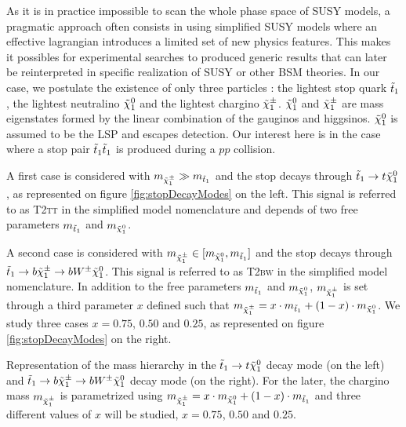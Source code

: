         As it is in practice impossible to scan the whole phase space of SUSY models, a 
        pragmatic approach often consists in using simplified SUSY models where an 
        effective lagrangian introduces a limited set of new physics features. This makes
        it possibles for experimental searches to produced generic results that can later
        be reinterpreted in specific realization of SUSY \cite{LiemSMS, SmodelS} 
        or other BSM theories. In our case, we postulate the existence of only three 
        particles : the lightest stop quark $\tilde{t}_1$, the lightest neutralino $\tilde{\chi}_1^0$ 
        and the lightest chargino $\tilde{\chi}_1^\pm$. $\tilde{\chi}_1^0$ and $\tilde{\chi}_1^\pm$ are mass 
        eigenstates formed by the linear combination of the gauginos and  higgsinos. 
        $\tilde{\chi}_1^0$ is assumed to be the LSP and escapes detection. Our interest here 
        is in the case where a stop pair $\tilde{t}_1\tilde{t}_1$ is produced during a $pp$ collision.

        A first case is considered with $m_{\tilde{\chi}_1^\pm} \gg m_{\tilde{t}_1}$ and the stop 
        decays through $\tilde{t}_1 \rightarrow t \tilde{\chi}_1^0$, as represented on figure 
        \ref{fig:stopDecayModes} on the left. This signal is referred to as \textsc{T2tt} 
        in the simplified model nomenclature and depends of two free parameters 
        $m_{\tilde{t}_1}$ and $m_{\tilde{\chi}_1^0}$.

        A second case is considered with $m_{\tilde{\chi}_1^\pm} \in [m_{\tilde{\chi}_1^0}, 
        m_{\tilde{t}_1}]$ and the stop decays through $\tilde{t}_1 \rightarrow b \tilde{\chi}_1^\pm 
        \rightarrow b W^{\pm} \tilde{\chi}_1^0$. This signal is referred to as \textsc{T2bw} 
        in the simplified model nomenclature. In addition to the free  parameters 
        $m_{\tilde{t}_1}$ and $m_{\tilde{\chi}_1^0}$, $m_{\tilde{\chi}_1^\pm}$ is set through a 
        third parameter $x$ defined such that $m_{\tilde{\chi}_1^\pm} = x \cdot m_{\tilde{t}_1} 
        + (1 - x) \cdot m_{\tilde{\chi}_1^0}$. We study three cases $x = 0.75$, $0.50$ 
        and $0.25$, as represented on figure \ref{fig:stopDecayModes} on the right.

                     {Representation of the mass hierarchy in the $\tilde{t}_1 \rightarrow t 
                     \tilde{\chi}_1^0$ decay mode (on the left) and $\tilde{t}_1 \rightarrow b 
                     \tilde{\chi}_1^\pm \rightarrow b W^{\pm} \tilde{\chi}_1^0 $ decay mode (on the 
                     right). For the later, the chargino mass $m_{\tilde{\chi}_1^\pm}$ is 
                     parametrized using $m_{\tilde{\chi}_1^\pm} = x \cdot m_{\tilde{\chi}_1^0} 
                     + (1 - x) \cdot m_{\tilde{t}_1}$ and three different values of $x$ will
                     be studied, $x = 0.75$, $0.50$ and $0.25$.} 

